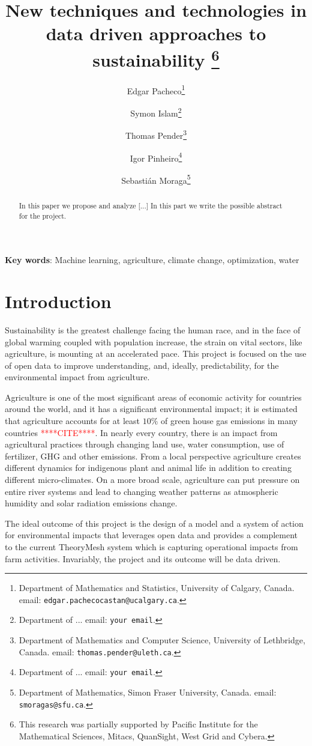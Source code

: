 \documentclass[11pt]{article}
\title{New techniques and technologies in data driven approaches to sustainability
\thanks{This research was 
partially supported by  Pacific Institute for the Mathematical Sciences, Mitacs, QuanSight, West Grid and Cybera.}}
\author{{\sc Edgar Pacheco}\thanks{Department of Mathematics and Statistics, University of Calgary, Canada.
email: {\tt edgar.pachecocastan@ucalgary.ca}.}
\and
{\sc Symon Islam}\thanks{Department of ...
email: {\tt your email}.}
\and
{\sc Thomas Pender}\thanks{Department of Mathematics and Computer Science, University of Lethbridge, Canada.
email: {\tt thomas.pender@uleth.ca}.}
\and
{\sc Igor Pinheiro}\thanks{Department of ...
email: {\tt your email}.}
\and
{\sc Sebasti\'an Moraga}\thanks{ Department of Mathematics, Simon Fraser University, Canada.
email: {\tt smoragas@sfu.ca}.}}
\date{ }
\numberwithin{equation}{section}
\numberwithin{figure}{section}
\begin{document}
\maketitle
{}
\begin{abstract}
\noindent
In this paper we propose and analyze [...] In this part we write the possible abstract for the project.

\end{abstract}

\noindent
{\bf Key words}: Machine learning, agriculture, climate change, optimization, water

\smallskip\noindent

                                                  

\section{Introduction}\label{section1}

Sustainability is the greatest challenge facing the human race, and in the face of global warming coupled with population increase, the strain on vital sectors, like agriculture, is mounting at an accelerated pace. This project is focused on the use of open data to improve understanding, and, ideally, predictability, for the environmental impact from agriculture. 

Agriculture is one of the most significant areas of economic activity for countries around the world, and it has a significant environmental impact; it is estimated that agriculture accounts for at least $10\%$ of green house gas emissions in many countries \textcolor{red}{****CITE****}. In nearly every country, there is an impact from agricultural practices through changing land use, water consumption, use of fertilizer, GHG and other emissions. From a local perspective agriculture creates different dynamics for indigenous plant and animal life in addition to creating different micro-climates. On a more broad scale, agriculture can put pressure on entire river systems and lead to changing weather patterns as atmospheric humidity and solar radiation emissions change.

The ideal outcome of this project is the design of a model and a system of action for environmental impacts that leverages open data and provides a complement to the current TheoryMesh system which is capturing operational impacts from farm activities. Invariably, the project and its outcome will be data driven.
\end{document}
